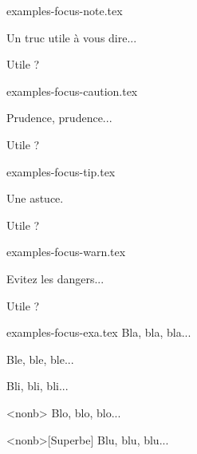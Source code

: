 \begin{filecontents*}[overwrite]{examples-focus-note.tex}
\begin{tdocnote}
    Un truc utile à vous dire...
\end{tdocnote}

\begin{tdocnote}
    Utile ?
\end{tdocnote}
\end{filecontents*}


\begin{filecontents*}[overwrite]{examples-focus-caution.tex}
\begin{tdoccaution}
    Prudence, prudence...
\end{tdoccaution}

\begin{tdoccaution}
    Utile ?
\end{tdoccaution}
\end{filecontents*}


\begin{filecontents*}[overwrite]{examples-focus-tip.tex}
\begin{tdoctip}
    Une astuce.
\end{tdoctip}

\begin{tdoctip}
    Utile ?
\end{tdoctip}
\end{filecontents*}


\begin{filecontents*}[overwrite]{examples-focus-warn.tex}
\begin{tdocwarn}
    Evitez les dangers...
\end{tdocwarn}

\begin{tdocwarn}
    Utile ?
\end{tdocwarn}
\end{filecontents*}


\begin{filecontents*}[overwrite]{examples-focus-exa.tex}
Bla, bla, bla...

\begin{tdocexa}
    Ble, ble, ble...
\end{tdocexa}

\begin{tdocexa}[Magnifique]
    Bli, bli, bli...
\end{tdocexa}

\begin{tdocexa}<nonb>
    Blo, blo, blo...
\end{tdocexa}

\begin{tdocexa}<nonb>[Superbe]
    Blu, blu, blu...
\end{tdocexa}
\end{filecontents*}


